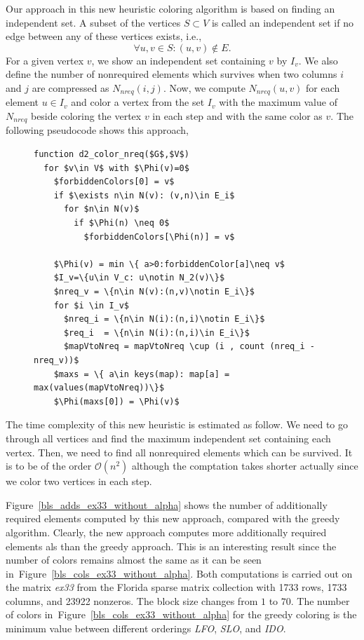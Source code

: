 \documentclass[12pt, oneside]{book}
\newcommand{\figref}[1]{Figure~\protect\ref{#1}}
\begin{document}
Our approach in this new heuristic coloring algorithm is based on finding an independent set. A subset of the vertices $S\subset V$ is
called an independent set if no edge between any of these vertices exists, i.e.,
$$\forall u,v\in S: (u,v)\notin E.$$
For a given vertex $v$, we show an independent set containing $v$ by $I_v$. We also define the number of nonrequired elements which survives when two columns $i$ and $j$ are compressed as $N_{nreq}(i,j)$. Now, we compute $N_{nreq}(u,v)$ for each element $u\in I_v$ and color a vertex from the set $I_v$ with the maximum value of $N_{nreq}$ beside coloring the vertex $v$ in each step and with the same color as $v$. The following pseudocode shows this approach, 
\begin{figure}
\begin{lstlisting}[caption=New coloring heuristc.,label=code.new.d2,mathescape]
function d2_color_nreq($G$,$V$)
  for $v\in V$ with $\Phi(v)=0$
    $forbiddenColors[0] = v$
    if $\exists n\in N(v): (v,n)\in E_i$ 
      for $n\in N(v)$
        if $\Phi(n) \neq 0$
          $forbiddenColors[\Phi(n)] = v$

    $\Phi(v) = min \{ a>0:forbiddenColor[a]\neq v$
    $I_v=\{u\in V_c: u\notin N_2(v)\}$
    $nreq_v = \{n\in N(v):(n,v)\notin E_i\}$
    for $i \in I_v$
      $nreq_i = \{n\in N(i):(n,i)\notin E_i\}$
      $req_i  = \{n\in N(i):(n,i)\in E_i\}$ 
      $mapVtoNreq = mapVtoNreq \cup (i , count (nreq_i - nreq_v))$
    $maxs = \{ a\in keys(map): map[a] = max(values(mapVtoNreq))\}$
    $\Phi(maxs[0]) = \Phi(v)$
\end{lstlisting}
\end{figure}

The time complexity of this new heuristic is estimated as follow.
We need to go through all vertices 
and find the maximum independent set containing each vertex. 
Then, we need to find all nonrequired elements which can be survived.
It is to be of the order $\mathcal{O}(n^2)$ 
although the comptation takes shorter actually
since we color two vertices in each step. 

\figref{bls_adds_ex33_without_alpha} shows the number of additionally required elements
computed by this new approach, compared with the greedy algorithm. Clearly, 
the new approach computes more additionally required elements als than the greedy approach.
This is an interesting result since the number of colors remains almost the same
as it can be seen in~\figref{bls_cols_ex33_without_alpha}.
Both computations is carried out on the matrix \textit{ex33} from the Florida sparse matrix
collection with 1733 rows, 1733 columns, and 23922 nonzeros. The block size changes 
from $1$ to $70$. The number of colors in~\figref{bls_cols_ex33_without_alpha} for the greedy coloring
is the minimum value between different orderings \textit{LFO}, \textit{SLO}, and \textit{IDO}.
\end{document}
